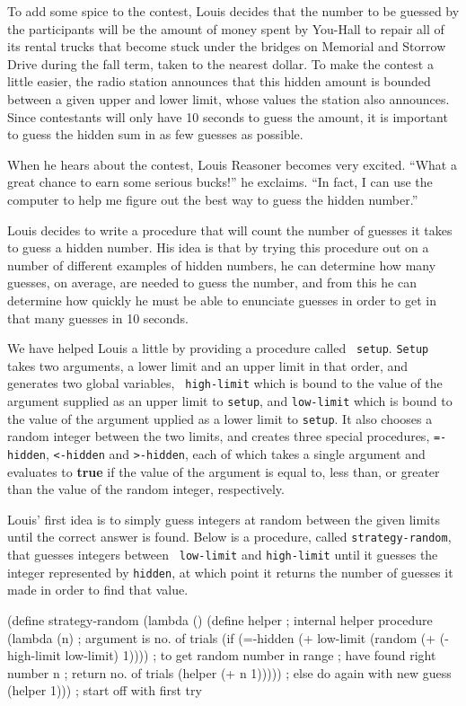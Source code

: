 To add some spice to the contest, Louis decides that the number to be
guessed by the participants will be the amount of money spent by
You-Hall to repair all of its rental trucks that become stuck under the
bridges on Memorial and Storrow Drive during the fall term, taken to the
nearest dollar.  To make the contest a little easier, the radio station
announces that this hidden amount is bounded between a given upper and
lower limit, whose values the station also announces.  Since contestants
will only have 10 seconds to guess the amount, it is important to guess
the hidden sum in as few guesses as possible.

When he hears about the contest, Louis Reasoner becomes very excited.
``What a great chance to earn some serious bucks!'' he exclaims.  ``In
fact, I can use the computer to help me figure out the best way to guess
the hidden number.''

Louis decides to write a procedure that will count the number of guesses
it takes to guess a hidden number.  His idea is that by trying this
procedure out on a number of different examples of hidden numbers, he
can determine how many guesses, on average, are needed to guess the
number, and from this he can determine how quickly he must be able to
enunciate guesses in order to get in that many guesses in 10 seconds.

We have helped Louis a little by providing a procedure called {\tt
setup}.  {\tt Setup} takes two arguments, a lower limit and an upper
limit in that order, and generates two global variables, {\tt
high-limit} which is bound to the value of the argument supplied as an
upper limit to {\tt setup}, and {\tt low-limit} which is bound to the
value of the argument upplied as a lower limit to {\tt setup}.  It also
chooses a random integer between the two limits, and creates three
special procedures, {\tt =-hidden}, {\tt <-hidden} and {\tt >-hidden},
each of which takes a single argument and evaluates to {\bf true} if the
value of the argument is equal to, less than, or greater than the value
of the random integer, respectively.

Louis' first idea is to simply guess integers at random between the
given limits until the correct answer is found.  Below is a procedure,
called {\tt strategy-random}, that guesses integers between {\tt
low-limit} and {\tt high-limit} until it guesses the integer represented
by {\tt hidden}, at which point it returns the number of guesses it made
in order to find that value.

\beginlisp
(define strategy-random
  (lambda ()
    (define helper                             ; internal helper procedure
      (lambda (n)                              ; argument is no. of trials
        (if (=-hidden (+ low-limit
                         (random (+ (- high-limit low-limit)
                                 1))))         ; to get random number in range
                                               ; have found right number
            n                                  ; return no. of trials
            (helper (+ n 1)))))                ; else do again with new guess
    (helper 1)))                               ; start off with first try
\endlisp


